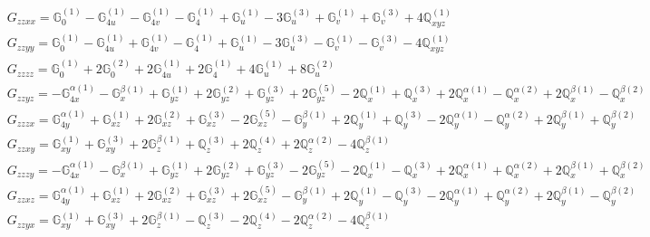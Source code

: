 \documentclass[fleqn,8pt,landscape]{jsarticle}
\begin{document}
\begin{align*}
& G_{zzxx} = \mathbb{G}_{0}^{(1)} - \mathbb{G}_{4u}^{(1)} - \mathbb{G}_{4v}^{(1)} - \mathbb{G}_{4}^{(1)} + \mathbb{G}_{u}^{(1)} - 3 \mathbb{G}_{u}^{(3)} + \mathbb{G}_{v}^{(1)} + \mathbb{G}_{v}^{(3)} + 4 \mathbb{Q}_{xyz}^{(1)} \\
& G_{zzyy} = \mathbb{G}_{0}^{(1)} - \mathbb{G}_{4u}^{(1)} + \mathbb{G}_{4v}^{(1)} - \mathbb{G}_{4}^{(1)} + \mathbb{G}_{u}^{(1)} - 3 \mathbb{G}_{u}^{(3)} - \mathbb{G}_{v}^{(1)} - \mathbb{G}_{v}^{(3)} - 4 \mathbb{Q}_{xyz}^{(1)} \\
& G_{zzzz} = \mathbb{G}_{0}^{(1)} + 2 \mathbb{G}_{0}^{(2)} + 2 \mathbb{G}_{4u}^{(1)} + 2 \mathbb{G}_{4}^{(1)} + 4 \mathbb{G}_{u}^{(1)} + 8 \mathbb{G}_{u}^{(2)} \\
& G_{zzyz} = - \mathbb{G}_{4x}^{\alpha(1)} - \mathbb{G}_{x}^{\beta(1)} + \mathbb{G}_{yz}^{(1)} + 2 \mathbb{G}_{yz}^{(2)} + \mathbb{G}_{yz}^{(3)} + 2 \mathbb{G}_{yz}^{(5)} - 2 \mathbb{Q}_{x}^{(1)} + \mathbb{Q}_{x}^{(3)} + 2 \mathbb{Q}_{x}^{\alpha(1)} - \mathbb{Q}_{x}^{\alpha(2)} + 2 \mathbb{Q}_{x}^{\beta(1)} - \mathbb{Q}_{x}^{\beta(2)} \\
& G_{zzzx} = \mathbb{G}_{4y}^{\alpha(1)} + \mathbb{G}_{xz}^{(1)} + 2 \mathbb{G}_{xz}^{(2)} + \mathbb{G}_{xz}^{(3)} - 2 \mathbb{G}_{xz}^{(5)} - \mathbb{G}_{y}^{\beta(1)} + 2 \mathbb{Q}_{y}^{(1)} + \mathbb{Q}_{y}^{(3)} - 2 \mathbb{Q}_{y}^{\alpha(1)} - \mathbb{Q}_{y}^{\alpha(2)} + 2 \mathbb{Q}_{y}^{\beta(1)} + \mathbb{Q}_{y}^{\beta(2)} \\
& G_{zzxy} = \mathbb{G}_{xy}^{(1)} + \mathbb{G}_{xy}^{(3)} + 2 \mathbb{G}_{z}^{\beta(1)} + \mathbb{Q}_{z}^{(3)} + 2 \mathbb{Q}_{z}^{(4)} + 2 \mathbb{Q}_{z}^{\alpha(2)} - 4 \mathbb{Q}_{z}^{\beta(1)} \\
& G_{zzzy} = - \mathbb{G}_{4x}^{\alpha(1)} - \mathbb{G}_{x}^{\beta(1)} + \mathbb{G}_{yz}^{(1)} + 2 \mathbb{G}_{yz}^{(2)} + \mathbb{G}_{yz}^{(3)} - 2 \mathbb{G}_{yz}^{(5)} - 2 \mathbb{Q}_{x}^{(1)} - \mathbb{Q}_{x}^{(3)} + 2 \mathbb{Q}_{x}^{\alpha(1)} + \mathbb{Q}_{x}^{\alpha(2)} + 2 \mathbb{Q}_{x}^{\beta(1)} + \mathbb{Q}_{x}^{\beta(2)} \\
& G_{zzxz} = \mathbb{G}_{4y}^{\alpha(1)} + \mathbb{G}_{xz}^{(1)} + 2 \mathbb{G}_{xz}^{(2)} + \mathbb{G}_{xz}^{(3)} + 2 \mathbb{G}_{xz}^{(5)} - \mathbb{G}_{y}^{\beta(1)} + 2 \mathbb{Q}_{y}^{(1)} - \mathbb{Q}_{y}^{(3)} - 2 \mathbb{Q}_{y}^{\alpha(1)} + \mathbb{Q}_{y}^{\alpha(2)} + 2 \mathbb{Q}_{y}^{\beta(1)} - \mathbb{Q}_{y}^{\beta(2)} \\
& G_{zzyx} = \mathbb{G}_{xy}^{(1)} + \mathbb{G}_{xy}^{(3)} + 2 \mathbb{G}_{z}^{\beta(1)} - \mathbb{Q}_{z}^{(3)} - 2 \mathbb{Q}_{z}^{(4)} - 2 \mathbb{Q}_{z}^{\alpha(2)} - 4 \mathbb{Q}_{z}^{\beta(1)} \\

\end{align*}
\end{document}
